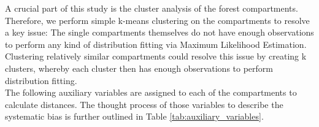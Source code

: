 
A crucial part of this study is the cluster analysis of the forest compartments. Therefore, we perform simple k-means clustering on the compartments to resolve a key issue: The single compartments themselves do not have enough
observations to perform any kind of distribution fitting via Maximum Likelihood Estimation. Clustering relatively similar compartments could resolve
this issue by creating k clusters, whereby each cluster then has enough observations to perform distribution fitting.\\

The following auxiliary variables are assigned to each of the compartments to calculate distances. The thought process of those variables to describe the systematic bias is further outlined in Table \ref{tab:auxiliary_variables}.

